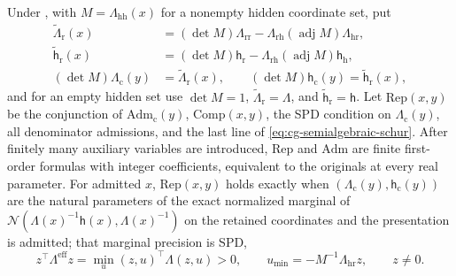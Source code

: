 Under , with \(M=\Lambda_{\mathrm{hh}}(x)\)
for a nonempty hidden coordinate set, put
\begin{equation}
\begin{aligned}
\widetilde\Lambda_{\mathrm r}(x)&=(\det M)\Lambda_{\mathrm{rr}}-\Lambda_{\mathrm{rh}}(\operatorname{adj}M)\Lambda_{\mathrm{hr}},\\
\widetilde{\mathsf h}_{\mathrm r}(x)&=(\det M)\mathsf h_{\mathrm r}-\Lambda_{\mathrm{rh}}(\operatorname{adj}M)\mathsf h_{\mathrm h},\\
(\det M)\Lambda_{\mathrm c}(y)&=\widetilde\Lambda_{\mathrm r}(x),\qquad
(\det M)\mathsf h_{\mathrm c}(y)=\widetilde{\mathsf h}_{\mathrm r}(x),
\end{aligned}
\label{eq:cg-semialgebraic-schur}
\end{equation}
and for an empty hidden set use \(\det M=1\), \(\widetilde\Lambda_{\mathrm r}=\Lambda\),
and \(\widetilde{\mathsf h}_{\mathrm r}=\mathsf h\). Let \(\mathrm{Rep}(x,y)\) be the
conjunction of \(\mathrm{Adm}_{\mathrm c}(y)\), \(\mathrm{Comp}(x,y)\), the SPD
condition on \(\Lambda_{\mathrm c}(y)\), all denominator admissions, and the last
line of \eqref{eq:cg-semialgebraic-schur}. After finitely many auxiliary
variables are introduced, \(\mathrm{Rep}\) and \(\mathrm{Adm}\) are finite
first-order formulas with integer coefficients, equivalent to the originals at
every real parameter. For admitted \(x\), \(\mathrm{Rep}(x,y)\) holds exactly when
\((\Lambda_{\mathrm c}(y),\mathsf h_{\mathrm c}(y))\) are the natural parameters of the
exact normalized marginal of
\(\mathcal N(\Lambda(x)^{-1}\mathsf h(x),\Lambda(x)^{-1})\) on the retained
coordinates and the presentation is admitted; that marginal precision is SPD,
\begin{equation}
z^\top\Lambda^{\mathrm{eff}}z
=\min_u (z,u)^\top\Lambda(z,u)>0,
\qquad
u_{\min}=-M^{-1}\Lambda_{\mathrm{hr}}z,
\qquad z\neq0 .
\label{eq:cg-semialgebraic-schur-positive}
\end{equation}

